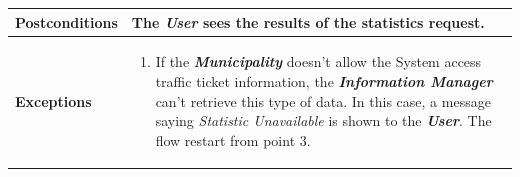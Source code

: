 \documentclass{report}
\begin{document}
\begin{tabularx}{\linewidth}{| l | X |}
	\hline
	\textbf{Postconditions} & The \textbf{\textit{User}} sees the results of the statistics request.\\
	
	\hline
	\textbf{Exceptions} & \parbox{0.7\textwidth}{ \begin{enumerate}
			\item If the \textbf{\textit{Municipality}} doesn't allow the System access traffic ticket information, the \textbf{\textit{Information Manager}} can't retrieve this type of data. In this case, a message saying \textit{Statistic Unavailable} is shown to the \textbf{\textit{User}}. The flow restart from point 3.  
		\end{enumerate}}\\
	
	\hline
	
\end{tabularx}
\newpage
\end{document}
